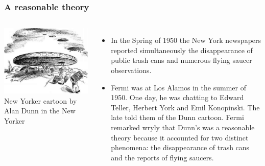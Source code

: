 
\begin{frame}
\frametitle{A reasonable theory}

\begin{columns}
\includegraphics[scale=0.3]{aliens}
New Yorker cartoon by Alan Dunn in the New Yorker


\begin{itemize}
\item In the Spring of 1950 the New York newspapers reported simultaneously the disappearance of public trash cans and numerous flying saucer observations. 

\item Fermi was at Los Alamos in the summer of 1950. One day, he was chatting to Edward Teller, Herbert York and Emil Konopinski. The late told them of the Dunn cartoon. Fermi remarked wryly that Dunn's was a reasonable theory because it accounted for two distinct phenomena: the disappearance of trash cans and the reports of flying saucers. 
\end{itemize}
\end{columns}
\end{frame}

